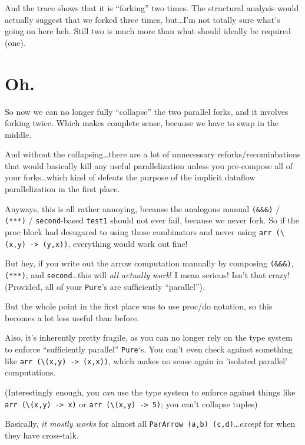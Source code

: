\documentclass[]{article}
\begin{document}
And the trace shows that it is ``forking'' two times. The structural analysis
would actually suggest that we forked three times, but\ldots I'm not totally
sure what's going on here heh. Still two is much more than what should ideally
be required (one).

\section{Oh.}\label{oh.}

So now we can no longer fully ``collapse'' the two parallel forks, and it
involves forking twice. Which makes complete sense, because we have to swap in
the middle.

And without the collapsing\ldots there are a lot of unnecessary
reforks/recominbations that would basically kill any useful parallelization
unless you pre-compose all of your forks\ldots which kind of defeats the purpose
of the implicit dataflow parallelization in the first place.

Anyways, this is all rather annoying, because the analogous manual
\texttt{(\&\&\&)} / \texttt{(***)} / \texttt{second}-based \texttt{test1} should
not ever fail, because we never fork. So if the proc block had desugared to
using those combinators and never using
\texttt{arr\ (\textbackslash{}(x,y)\ -\textgreater{}\ (y,x))}, everything would
work out fine!

But hey, if you write out the arrow computation manually by composing
\texttt{(\&\&\&)}, \texttt{(***)}, and \texttt{second}\ldots this will \emph{all
actually work}! I mean serious! Isn't that crazy! (Provided, all of your
\texttt{Pure}'s are sufficiently ``parallel'').

But the whole point in the first place was to use proc/do notation, so this
becomes a lot less useful than before.

Also, it's inherently pretty fragile, as you can no longer rely on the type
system to enforce ``sufficiently parallel'' \texttt{Pure}`s. You can't even
check against something like
\texttt{arr\ (\textbackslash{}(x,y)\ -\textgreater{}\ (x,x))}, which makes no
sense again in 'isolated parallel' computations.

(Interestingly enough, you \emph{can} use the type system to enforce against
things like \texttt{arr\ (\textbackslash{}(x,y)\ -\textgreater{}\ x)} or
\texttt{arr\ (\textbackslash{}(x,y)\ -\textgreater{}\ 5)}; you can't collapse
tuples)

Basically, \emph{it mostly works} for almost all
\texttt{ParArrow\ (a,b)\ (c,d)}\ldots{}\emph{except} for when they have
cross-talk.
\end{document}
